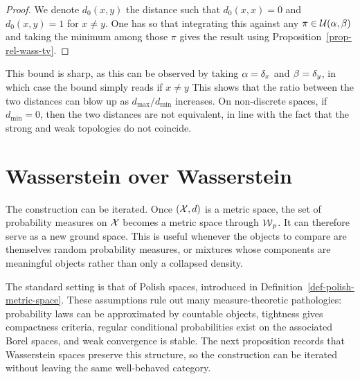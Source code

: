 \begin{proof}
	We denote $d_0(x,y)$ the distance such that $d_0(x,x)=0$ and $d_0(x,y)=1$ for $x \neq y$. One has
	so that integrating this against any $\pi \in \mathcal{U}(\alpha,\beta)$ and taking the minimum among those $\pi$ gives the result using Proposition~\ref{prop-rel-wass-tv}.
\end{proof}

This bound is sharp, as this can be observed by taking $\alpha=\delta_{x}$ and $\beta=\delta_y$, in which case the bound simply reads if $x \neq y$
%
This shows that the ratio between the two distances can blow up as $d_{\max}/d_{\min}$ increases. On non-discrete spaces, if $d_{\min}=0$, then the two distances are not equivalent, in line with the fact that the strong and weak topologies do not coincide.

\section{Wasserstein over Wasserstein}
\label{sec-wasserstein-over-wasserstein}

The construction can be iterated. Once $(\mathcal{X},d)$ is a metric space, the set of probability measures on $\mathcal{X}$ becomes a metric space through $\operatorname{\mathcal{W}}_p$. It can therefore serve as a new ground space. This is useful whenever the objects to compare are themselves random probability measures, or mixtures whose components are meaningful objects rather than only a collapsed density.

The standard setting is that of Polish spaces, introduced in Definition~\ref{def-polish-metric-space}. These assumptions rule out many measure-theoretic pathologies: probability laws can be approximated by countable objects, tightness gives compactness criteria, regular conditional probabilities exist on the associated Borel spaces, and weak convergence is stable. The next proposition records that Wasserstein spaces preserve this structure, so the construction can be iterated without leaving the same well-behaved category.

